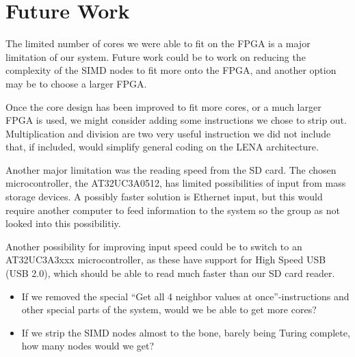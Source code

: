 \section{Future Work}
The limited number of cores we were able to fit on the FPGA is a major limitation
of our system. Future work could be to work on reducing the complexity of the
SIMD nodes to fit more onto the FPGA, and another option may be to choose a larger
FPGA.

Once the core design has been improved to fit more cores, or a much larger FPGA is
used, we might consider adding some instructions we chose to strip out. Multiplication
and division are two very useful instruction we did not include that, if included, would simplify
general coding on the LENA architecture.

Another major limitation was the reading speed from the SD card.
The chosen microcontroller, the AT32UC3A0512, has limited possibilities of input
from mass storage devices. A possibly faster solution is Ethernet input, but this
would require another computer to feed information to the system so the group
as not looked into this possibilitiy.

Another possibility for improving input speed could be to switch to an AT32UC3A3xxx
microcontroller, as these have support for High Speed USB (USB 2.0), which should be
able to read much faster than our SD card reader.
\begin{itemize}
\item If we removed the special ``Get all 4 neighbor values at
  once''-instructions and other special parts of the system, would we be able to
  get more cores?
\item If we strip the \ac{SIMD} nodes almost to the bone, barely being Turing
  complete, how many nodes would we get?
\end{itemize}

